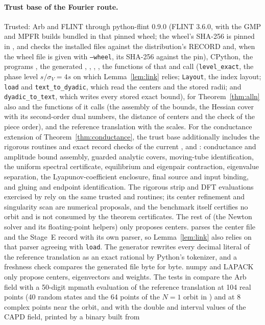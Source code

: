 \documentclass[11pt]{article}
\theoremstyle{definition}
\begin{document}
\paragraph{Trust base of the Fourier route.} Trusted: Arb and FLINT through python-flint 0.9.0 (FLINT 3.6.0, with the GMP and MPFR builds bundled in that pinned wheel; the wheel's SHA-256 is pinned in , and  checks the installed files against the distribution's RECORD and, when the wheel file is given with \texttt{--wheel}, its SHA-256 against the pin), CPython, the programs , the generated , , , , the functions of  that  and  call (\texttt{level\_exact}, the phase level $s/\sigma_V = 4s$ on which Lemma~\ref{lem:link} relies; \texttt{Layout}, the index layout; \texttt{load} and \texttt{text\_to\_dyadic}, which read the centers and the stored radii; and \texttt{dyadic\_to\_text}, which writes every stored exact bound), for Theorem~\ref{thm:alln} also  and the functions of  it calls (the assembly of the bounds, the Hessian cover with its second-order dual numbers, the distance of centers and the check of the piece order), and the reference translation  with the scales. For the conductance extension of Theorem~\ref{thm:conductance}, the trust base additionally includes the rigorous routines and exact record checks of the current ,  and : conductance and amplitude bound assembly, guarded analytic covers, moving-tube identification, the uniform spectral certificate, equilibrium and eigenpair contraction, eigenvalue separation, the Lyapunov-coefficient enclosure, final source and input binding, and gluing and endpoint identification. The rigorous strip and DFT evaluations exercised by  rely on the same trusted  and  routines; its center refinement and singularity scan are numerical proposals, and the benchmark itself certifies no orbit and is not consumed by the theorem certificates. The rest of  (the Newton solver and its floating-point helpers) only proposes centers.  parses the center file and the Stage~E record with its own parser, so Lemma~\ref{lem:link} also relies on that parser agreeing with \texttt{load}. The generator rewrites every decimal literal of the reference translation as an exact rational by Python's tokenizer, and a freshness check compares the generated file byte for byte. numpy and LAPACK only propose centers, eigenvectors and weights. The tests in  compare the Arb field with a 50-digit mpmath evaluation of the reference translation at 104 real points (40 random states and the 64 points of the $N = 1$ orbit in ) and at 8 complex points near the orbit, and with the double and interval values of the CAPD field, printed by a binary built from 
\end{document}

